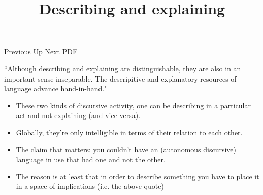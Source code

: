 \documentclass[12pt,a4paper]{report}
\begin{document}
 \href{doc/phil/People/Sellars/Quotes/Community.html}{Previous} 
 \href{doc/phil/People/Sellars/Quotes.html}{Up} 
 \href{doc/phil/People/Sellars/Quotes/Describingtheworldwithoutmodality.html}{Next} 
 \href{doc/phil/People/Sellars/Quotes/Describingandexplaining.pdf}{PDF} 
\title{Describing and explaining}
``Although describing and explaining are distinguishable, they are also in an
important sense inseparable. The descripitive and explanatory resources of
language advance hand-in-hand."

\begin{itemize}
    \item  These two kinds of discursive activity, one can be describing in a
           particular act and not explaining (and vice-versa).
    \item Globally, they're only intelligible in terms of their relation to
          each other.
    \item The claim that matters: you couldn't have an  (autonomous discursive)
          language in use that had one and not the other.
    \item The reason is at least that in order to describe something you have
          to place it in a space of implications (i.e. the above quote)
\end{itemize}
\end{document}
